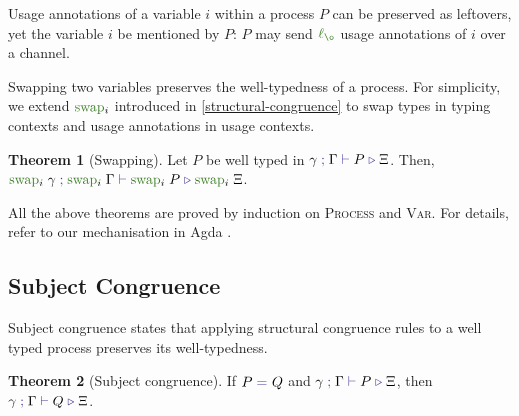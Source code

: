 \documentclass[a4paper,UKenglish,cleveref,autoref,thm-restate,authorcolumns]{lipics-v2019}
\theoremstyle{definition}
\newtheorem{nitheorem}{Theorem}
\newcommand{\type}[1]{\textcolor{BlueViolet}{\operatorname{#1}}}
\newcommand{\func}[1]{\textcolor{OliveGreen}{\operatorname{#1}}}
\newcommand{\lz}{\func{\ell_{\o}}}
\newcommand{\types}[4]{#1 \; \type{;} \; #2 \; \type{\vdash} \; #3 \; \type{\triangleright} \; #4}
\newcommand{\eq}[1]{\; \type{=}_{#1} \;}
\begin{document}
\begin{remark}
  Usage annotations of a variable $i$ within a process $P$ can be preserved as leftovers, yet the variable $i$ be mentioned by $P$: $P$ may send $\lz$ usage annotations of $i$ over a channel.
\end{remark}

Swapping two variables preserves the well-typedness of a process.
For simplicity, we extend $\func{swap}_i$ introduced in \autoref{structural-congruence} to swap types in typing contexts and usage annotations in usage contexts.
\begin{nitheorem}[Swapping]
  \label{thm:swapping}
  Let $P$ be well typed in $\types{\gamma}{\Gamma}{P}{\Xi}$.
  Then, $\types{\func{swap}_i \; \gamma}{\func{swap}_i \; \Gamma}{\func{swap}_i \; P}{\func{swap}_i \; \Xi}$.
\end{nitheorem}

All the above theorems are proved by induction on \textsc{Process} and \textsc{Var}.
For details, refer to our mechanisation in Agda \cite{Zalakain2020Agda}.


\subsection{Subject Congruence}
\label{subject-congruence}

Subject congruence states that applying structural congruence rules to a well typed process preserves its well-typedness.
\begin{nitheorem}[Subject congruence]
  \label{thm:subject-congruence}
  If $P \eq{} Q$ and $\types{\gamma}{\Gamma}{P}{\Xi}$, then $\types{\gamma}{\Gamma}{Q}{\Xi}$.
\end{nitheorem}
\end{document}
